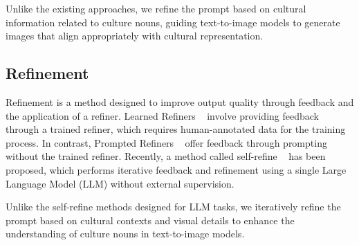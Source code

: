  Unlike the existing approaches, we refine the prompt based on cultural information related to culture nouns, guiding text-to-image models to generate images that align appropriately with cultural representation.

\subsection{Refinement}
Refinement is a method designed to improve output quality through feedback and the application of a refiner. Learned Refiners ~\citep{schick2022peer,saunders2022self} involve providing feedback through a trained refiner, which requires human-annotated data for the training process. In contrast, Prompted Refiners ~\citep{peng2023check,yang2022re3} offer feedback through prompting without the trained refiner. Recently, a method called self-refine ~\citep{madaan2024self} has been proposed, which performs iterative feedback and refinement using a single Large Language Model (LLM) without external supervision.

Unlike the self-refine methods designed for LLM tasks, we iteratively refine the prompt based on cultural contexts and visual details to enhance the understanding of culture nouns in text-to-image models.